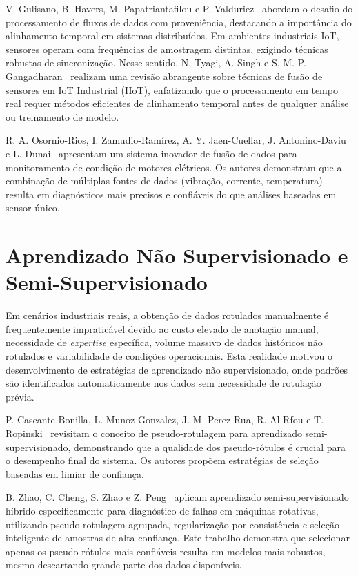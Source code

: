 V. Gulisano, B. Havers, M. Papatriantafilou e P. Valduriez~\cite{gulisano2020ananke} abordam o desafio do processamento de fluxos de dados com proveniência, destacando a importância do alinhamento temporal em sistemas distribuídos. Em ambientes industriais IoT, sensores operam com frequências de amostragem distintas, exigindo técnicas robustas de sincronização. Nesse sentido, N. Tyagi, A. Singh e S. M. P. Gangadharan~\cite{tyagi2024comprehensive} realizam uma revisão abrangente sobre técnicas de fusão de sensores em IoT Industrial (IIoT), enfatizando que o processamento em tempo real requer métodos eficientes de alinhamento temporal antes de qualquer análise ou treinamento de modelo.

R. A. Osornio-Rios, I. Zamudio-Ramírez, A. Y. Jaen-Cuellar, J. Antonino-Daviu e L. Dunai~\cite{osornio2023data} apresentam um sistema inovador de fusão de dados para monitoramento de condição de motores elétricos. Os autores demonstram que a combinação de múltiplas fontes de dados (vibração, corrente, temperatura) resulta em diagnósticos mais precisos e confiáveis do que análises baseadas em sensor único.

\section{Aprendizado Não Supervisionado e Semi-Supervisionado}

Em cenários industriais reais, a obtenção de dados rotulados manualmente é frequentemente impraticável devido ao custo elevado de anotação manual, necessidade de \textit{expertise} específica, volume massivo de dados históricos não rotulados e variabilidade de condições operacionais. Esta realidade motivou o desenvolvimento de estratégias de aprendizado não supervisionado, onde padrões são identificados automaticamente nos dados sem necessidade de rotulação prévia.

P. Cascante-Bonilla, L. Munoz-Gonzalez, J. M. Perez-Rua, R. Al-Rfou e T. Ropinski~\cite{cascante2021revisiting} revisitam o conceito de pseudo-rotulagem para aprendizado semi-supervisionado, demonstrando que a qualidade dos pseudo-rótulos é crucial para o desempenho final do sistema. Os autores propõem estratégias de seleção baseadas em limiar de confiança.

B. Zhao, C. Cheng, S. Zhao e Z. Peng~\cite{zhao2023hybrid} aplicam aprendizado semi-supervisionado híbrido especificamente para diagnóstico de falhas em máquinas rotativas, utilizando pseudo-rotulagem agrupada, regularização por consistência e seleção inteligente de amostras de alta confiança. Este trabalho demonstra que selecionar apenas os pseudo-rótulos mais confiáveis resulta em modelos mais robustos, mesmo descartando grande parte dos dados disponíveis.

